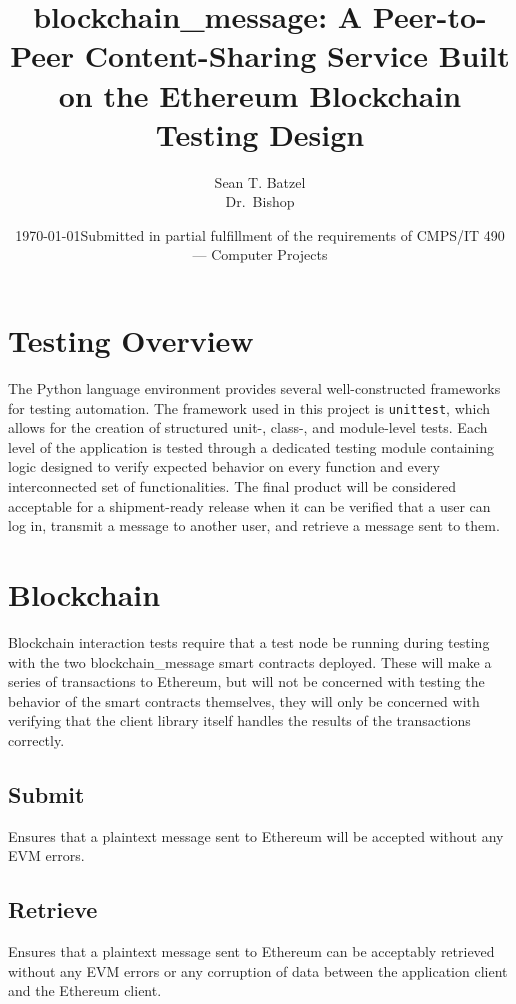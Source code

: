 \documentclass[titlepage]{report}
\title{blockchain\_message: A Peer-to-Peer Content-Sharing Service Built on the Ethereum Blockchain\\\large Testing Design}
\author{Sean T. Batzel\\Dr.\ Bishop}
\date{\today\endgraf\bigskip Submitted in partial fulfillment of the requirements of CMPS/IT 490 --- Computer Projects}
\begin{document}
\maketitle

\tableofcontents

\nocite{*}

\pagebreak

\section{Testing Overview}
The Python language environment provides several well-constructed frameworks for testing automation. The framework used in this project is \texttt{unittest}\cite{unittest}, which allows for the creation of structured unit-, class-, and module-level tests. Each level of the application is tested through a dedicated testing module containing logic designed to verify expected behavior on every function and every interconnected set of functionalities. The final product will be considered acceptable for a shipment-ready release when it can be verified that a user can log in, transmit a message to another user, and retrieve a message sent to them.

\section{Blockchain}
Blockchain interaction tests require that a test \gls{node} be running during testing with the two blockchain\_message \glspl{smart contract} deployed. These will make a series of transactions to \gls{Ethereum}, but will not be concerned with testing the behavior of the \glspl{smart contract} themselves, they will only be concerned with verifying that the client library itself handles the results of the transactions correctly.
\subsection{Submit}
Ensures that a plaintext message sent to \gls{Ethereum} will be accepted without any EVM errors.
\subsection{Retrieve}
Ensures that a plaintext message sent to \gls{Ethereum} can be acceptably retrieved without any EVM errors or any corruption of data between the application client and the \gls{Ethereum} client.
\end{document}
